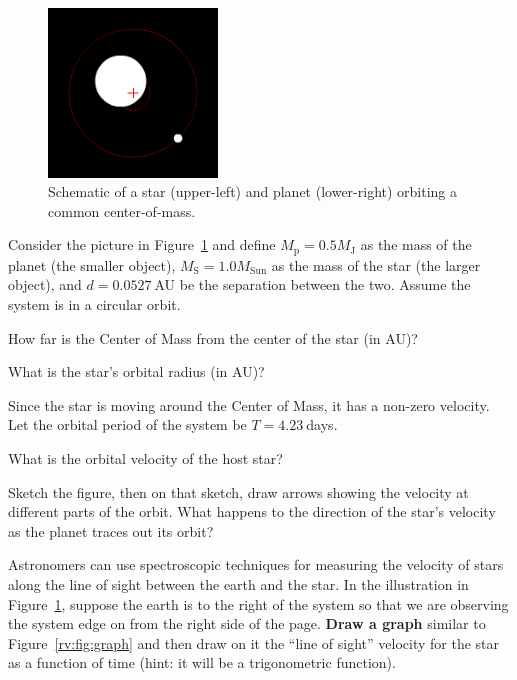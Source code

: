\begin{figure}
	\centering
	\includegraphics[width=0.4\textwidth]{radial-velocity/two-body-cm}
	\caption{Schematic of a star (upper-left) and planet (lower-right) orbiting a common center-of-mass.}\label{rv:fig:two-body-cm}
\end{figure}

Consider the picture in Figure~\ref{rv:fig:two-body-cm} and define $M_\textrm{p} = 0.5 M_\textrm{J}$ as the mass of the planet (the smaller object),  $M_\textrm{S} = 1.0 M_\textrm{Sun}$ as the mass of the star (the larger object), and $d = 0.0527\:$AU be the separation between the two. Assume the system is in a circular orbit.

\begin{steps}
	\item How far is the Center of Mass from the center of the star (in AU)?
	
	\item What is the star’s orbital radius (in AU)?
\end{steps}

Since the star is moving around the Center of Mass, it has a non-zero velocity. Let the orbital period of the system be $T = 4.23\:$days.

\begin{steps}
	\item What is the orbital velocity of the host star?
	
	\item Sketch the figure, then on that sketch, draw arrows showing the velocity at different parts of the orbit. What happens to the direction of the star’s velocity as the planet traces out its orbit?
\end{steps}

Astronomers can use spectroscopic techniques for measuring the velocity of stars along the line of sight between the earth and the star. In the illustration in Figure~\ref{rv:fig:two-body-cm}, suppose the earth is to the right of the system so that we are observing the system edge on from the right side of the page. \textbf{Draw a graph} similar to Figure~\ref{rv:fig:graph} and then draw on it the ``line of sight'' velocity for the star as a function of time (hint: it will be a trigonometric function).

